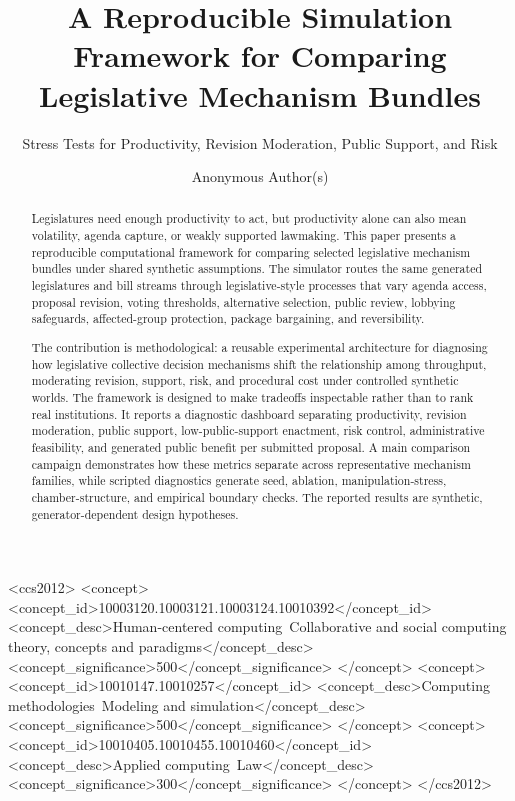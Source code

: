 \documentclass[manuscript]{acmart}
\begin{document}
\title[Legislative Mechanism Bundles]{A Reproducible Simulation Framework for Comparing Legislative Mechanism Bundles}
\subtitle{Stress Tests for Productivity, Revision Moderation, Public Support, and Risk}

\author{Anonymous Author(s)}
\renewcommand{\shortauthors}{Anonymous Author(s)}
\authorsaddresses{}

\begin{abstract}
Legislatures need enough productivity to act, but productivity alone can also mean volatility, agenda capture, or weakly supported lawmaking. This paper presents a reproducible computational framework for comparing selected legislative mechanism bundles under shared synthetic assumptions. The simulator routes the same generated legislatures and bill streams through legislative-style processes that vary agenda access, proposal revision, voting thresholds, alternative selection, public review, lobbying safeguards, affected-group protection, package bargaining, and reversibility.

The contribution is methodological: a reusable experimental architecture for diagnosing how legislative collective decision mechanisms shift the relationship among throughput, moderating revision, support, risk, and procedural cost under controlled synthetic worlds. The framework is designed to make tradeoffs inspectable rather than to rank real institutions. It reports a diagnostic dashboard separating productivity, revision moderation, public support, low-public-support enactment, risk control, administrative feasibility, and generated public benefit per submitted proposal. A main comparison campaign demonstrates how these metrics separate across representative mechanism families, while scripted diagnostics generate seed, ablation, manipulation-stress, chamber-structure, and empirical boundary checks. The reported results are synthetic, generator-dependent design hypotheses.
\end{abstract}

\begin{CCSXML}
<ccs2012>
<concept>
<concept_id>10003120.10003121.10003124.10010392</concept_id>
<concept_desc>Human-centered computing~Collaborative and social computing theory, concepts and paradigms</concept_desc>
<concept_significance>500</concept_significance>
</concept>
<concept>
<concept_id>10010147.10010257</concept_id>
<concept_desc>Computing methodologies~Modeling and simulation</concept_desc>
<concept_significance>500</concept_significance>
</concept>
<concept>
<concept_id>10010405.10010455.10010460</concept_id>
<concept_desc>Applied computing~Law</concept_desc>
<concept_significance>300</concept_significance>
</concept>
</ccs2012>
\end{CCSXML}
\end{document}
